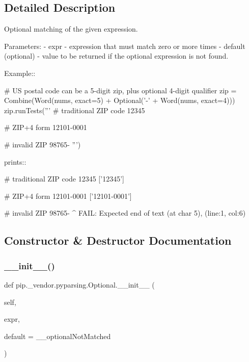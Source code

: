 \subsection{Detailed Description}
\begin{DoxyVerb}Optional matching of the given expression.

Parameters:
 - expr - expression that must match zero or more times
 - default (optional) - value to be returned if the optional expression is not found.

Example::

    # US postal code can be a 5-digit zip, plus optional 4-digit qualifier
    zip = Combine(Word(nums, exact=5) + Optional('-' + Word(nums, exact=4)))
    zip.runTests('''
        # traditional ZIP code
        12345

        # ZIP+4 form
        12101-0001

        # invalid ZIP
        98765-
        ''')

prints::

    # traditional ZIP code
    12345
    ['12345']

    # ZIP+4 form
    12101-0001
    ['12101-0001']

    # invalid ZIP
    98765-
         ^
    FAIL: Expected end of text (at char 5), (line:1, col:6)
\end{DoxyVerb}
 

\subsection{Constructor \& Destructor Documentation}
\mbox{\label{classpip_1_1__vendor_1_1pyparsing_1_1Optional_af7743bf78646c9edf865f668e73f5a4a}} 
\subsubsection{\texorpdfstring{\+\_\+\+\_\+init\+\_\+\+\_\+()}{\_\_init\_\_()}}
{\footnotesize\ttfamily def pip.\+\_\+vendor.\+pyparsing.\+Optional.\+\_\+\+\_\+init\+\_\+\+\_\+ (\begin{DoxyParamCaption}\item[{}]{self,  }\item[{}]{expr,  }\item[{}]{default = {\ttfamily \+\_\+\+\_\+optionalNotMatched} }\end{DoxyParamCaption})}



